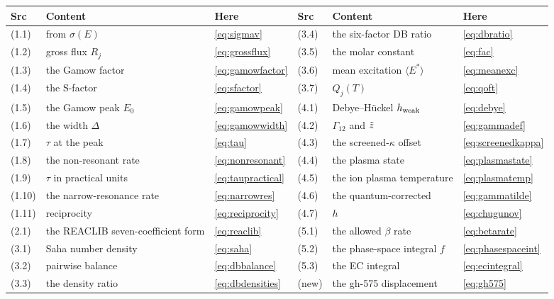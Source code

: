 \begin{center}
\begin{tabularx}{\textwidth}{@{}L{1.2cm} Y L{1.6cm} @{\hskip 6mm} L{1.2cm} Y L{1.6cm}@{}}
\toprule
\textbf{Src} & \textbf{Content} & \textbf{Here} &
\textbf{Src} & \textbf{Content} & \textbf{Here} \\
\midrule
(1.1)  & \sigv{} from $\sigma(E)$        & \eqref{eq:sigmav} &
(3.4)  & the six-factor DB ratio         & \eqref{eq:dbratio} \\
(1.2)  & gross flux $R_j$                & \eqref{eq:grossflux} &
(3.5)  & the molar constant \fac{}       & \eqref{eq:fac} \\
(1.3)  & the Gamow factor                & \eqref{eq:gamowfactor} &
(3.6)  & mean excitation $\langle E^*\rangle$ & \eqref{eq:meanexc} \\
(1.4)  & the S-factor                    & \eqref{eq:sfactor} &
(3.7)  & $Q_j(T)$                        & \eqref{eq:qoft} \\
(1.5)  & the Gamow peak $E_0$            & \eqref{eq:gamowpeak} &
(4.1)  & Debye--H\"uckel $h_{\rm weak}$  & \eqref{eq:debye} \\
(1.6)  & the width $\Delta$              & \eqref{eq:gamowwidth} &
(4.2)  & $\Gamma_{12}$ and $\tilde z$       & \eqref{eq:gammadef} \\
(1.7)  & $\tau$ at the peak              & \eqref{eq:tau} &
(4.3)  & the screened-$\kappa$ offset    & \eqref{eq:screenedkappa} \\
(1.8)  & the non-resonant rate           & \eqref{eq:nonresonant} &
(4.4)  & the plasma state                & \eqref{eq:plasmastate} \\
(1.9)  & $\tau$ in practical units       & \eqref{eq:taupractical} &
(4.5)  & the ion plasma temperature      & \eqref{eq:plasmatemp} \\
(1.10) & the narrow-resonance rate       & \eqref{eq:narrowres} &
(4.6)  & the quantum-corrected \gtil{}   & \eqref{eq:gammatilde} \\
(1.11) & reciprocity                     & \eqref{eq:reciprocity} &
(4.7)  &  $h$       & \eqref{eq:chugunov} \\
(2.1)  & the REACLIB seven-coefficient form & \eqref{eq:reaclib} &
(5.1)  & the allowed $\beta$ rate        & \eqref{eq:betarate} \\
(3.1)  & Saha number density             & \eqref{eq:saha} &
(5.2)  & the phase-space integral $f$    & \eqref{eq:phasespaceint} \\
(3.2)  & pairwise balance                & \eqref{eq:dbbalance} &
(5.3)  & the EC integral                 & \eqref{eq:ecintegral} \\
(3.3)  & the density ratio               & \eqref{eq:dbdensities} &
(new)  & the gh-575 displacement         & \eqref{eq:gh575} \\
\bottomrule
\end{tabularx}
\end{center}

